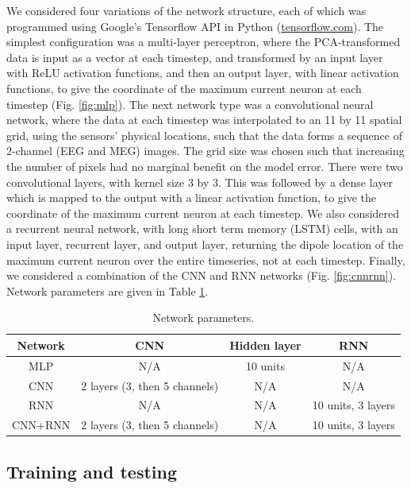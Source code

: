 \documentclass[journal,12pt,onecolumn,draftclsnofoot,]{IEEEtran}
\begin{document}
We considered four variations of the network structure, each of which was programmed using Google's Tensorflow API in Python (\url{tensorflow.com}). The simplest configuration was a multi-layer perceptron, where the PCA-transformed data is input as a vector at each timestep, and transformed by an input layer with ReLU activation functions, and then an output layer, with linear activation functions, to give the coordinate of the maximum current neuron at each timestep (Fig. \ref{fig:mlp}). The next network type was a convolutional neural network, where the data at each timestep was interpolated to an 11 by 11 spatial grid, using the sensors' physical locations, such that the data forms a sequence of 2-channel (EEG and MEG) images. The grid size was chosen such that increasing the number of pixels had no marginal benefit on the model error. There were two convolutional layers, with kernel size 3 by 3. This was followed by a dense layer which is mapped to the output with a linear activation function, to give the coordinate of the maximum current neuron at each timestep. We also considered a recurrent neural network, with long short term memory (LSTM) cells, with an input layer, recurrent layer, and output layer, returning the dipole location of the maximum current neuron over the entire timeseries, not at each timestep. Finally, we considered a combination of the CNN and RNN networks (Fig. \ref{fig:cnnrnn}). Network parameters are given in Table \ref{tab:params}. 

\begin{table}[h!]
  \centering
  \caption{Network parameters.}
  \begin{tabular}{c||c|c|c}
    \hline
    Network & CNN & Hidden layer & RNN\\
    \hline
    \hline
    MLP & N/A & 10 units & N/A \\
    \hline
    CNN & 2 layers (3, then 5 channels) & N/A & N/A \\
    \hline
    RNN & N/A & N/A & 10 units, 3 layers \\
    \hline
    CNN+RNN & 2 layers (3, then 5 channels) &  N/A & 10 units, 3 layers \\
  \end{tabular}
  \label{tab:params}
\end{table}


\subsection{Training and testing}
\end{document}
